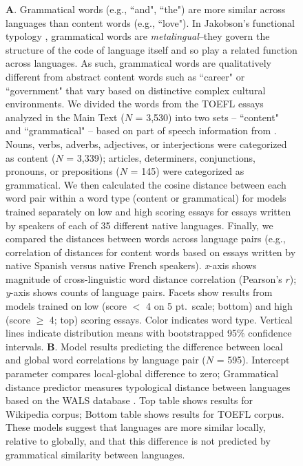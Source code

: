 \documentclass[9pt,twoside,lineno]{pnas-new}
\begin{document}
\begin{figure}[h]
  \caption{{\textbf A.} Grammatical words (e.g., ``and", ``the") are more similar across languages than content words (e.g., ``love"). In Jakobson's functional typology \cite{jakobson1990language}, grammatical words are \textit{metalingual}--they govern the structure of the code of language itself and so play a related function across languages. As such, grammatical words are qualitatively different from abstract content words such as ``career" or ``government" that vary based on distinctive complex cultural environments. We divided the words from the TOEFL essays analyzed in the Main Text ($N$ = 3,530) into two sets -- ``content" and ``grammatical"  -- based on  part of speech information from \cite{brysbaert2012adding}. Nouns, verbs, adverbs, adjectives, or interjections were categorized as content ($N$ = 3,339); articles, determiners, conjunctions, pronouns, or prepositions ($N$ = 145) were categorized as grammatical. We then calculated the cosine distance between each word pair within a word type (content or grammatical) for models trained separately on low and high scoring essays for essays written by speakers of each of 35 different native languages. Finally, we compared the distances between words across language pairs (e.g., correlation of distances for content words based on essays written by native Spanish versus native French speakers). {\it x}-axis shows magnitude of cross-linguistic word distance correlation (Pearson's $r$); {\it y}-axis shows counts of language pairs. Facets show results from models trained on low (score $<$ 4 on 5 pt.\ scale; bottom) and high (score $\geq$ 4; top) scoring essays. Color indicates word type. Vertical lines indicate distribution means with bootstrapped 95\% confidence intervals. {\textbf B.} Model results predicting the difference between local and global word correlations by language pair ($N$ = 595). Intercept parameter  compares local-global difference to zero; Grammatical distance predictor measures typological distance between languages based on the WALS database \cite{dediu2018trees,wals2013}. Top table shows results for Wikipedia corpus; Bottom table shows results for TOEFL corpus. These models suggest that languages are more similar locally, relative to globally, and that this difference is not predicted by grammatical similarity between languages.}
  \end{figure}

\pagebreak
 \clearpage
 
\end{document}
